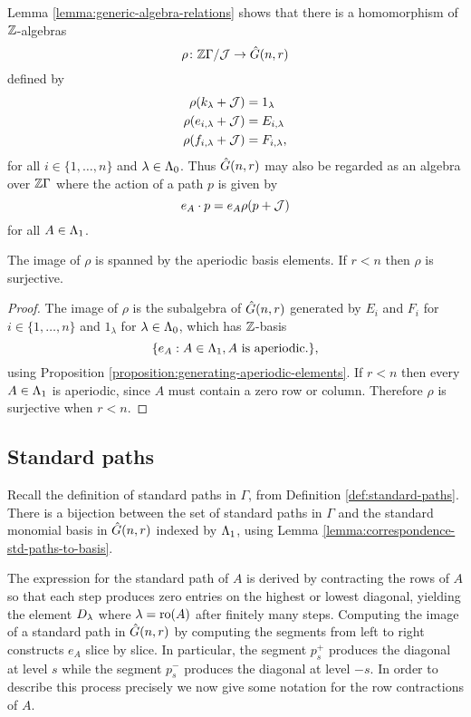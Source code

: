 \documentclass[a4paper, 11pt]{report}
\begin{document}
Lemma \ref{lemma:generic-algebra-relations} shows that there is a homomorphism of $\mathbb{Z}$-algebras
\begin{equation*}
\rho\colon\mathbb{Z}\Gamma/{\mathcal{J}}\to\hat{G}(n,r)
\end{equation*}
defined by
\begin{align*}
\rho(k_\lambda +\mathcal{J}) &= 1_\lambda\\
\rho(e_{i,\lambda} +\mathcal{J}) &= E_{i,\lambda}\\
\rho(f_{i,\lambda} +\mathcal{J}) &= F_{i,\lambda},
\end{align*}
for all $i\in\{1,\ldots,n\}$ and $\lambda\in\Lambda_0{}$. Thus $\hat{G}(n,r)$ may also be regarded as an algebra over $\mathbb{Z}\Gamma$ where the action of a path $p$ is given by
\begin{equation*}
e_A\cdot p = e_A\rho(p+\mathcal{J})
\end{equation*}
for all $A\in\Lambda_1{}$.

\begin{proposition}\label{proposition:image-of-quiver-algebra-generic}
The image of $\rho$ is spanned by the aperiodic basis elements. If $r<n$ then $\rho$ is surjective.
\end{proposition}

\begin{proof}
The image of $\rho$ is the subalgebra of $\hat{G}(n,r)$ generated by $E_i$ and $F_i$ for $i\in\{1,\ldots,n\}$ and $1_\lambda$ for $\lambda\in\Lambda_0{}$, which has $\mathbb{Z}$-basis
\begin{equation*}
\{e_A:A\in\Lambda_1{}, A\text{ is aperiodic.}\},
\end{equation*}
using Proposition \ref{proposition:generating-aperiodic-elements}. If $r<n$ then every $A\in\Lambda_1{}$ is aperiodic, since $A$ must contain a zero row or column. Therefore $\rho$ is surjective when $r<n$.
\end{proof}


\subsection{Standard paths}

Recall the definition of standard paths in $\Gamma$, from Definition \ref{def:standard-paths}. There is a bijection between the set of standard paths in $\Gamma$ and the standard monomial basis in $\hat{G}(n,r)$ indexed by $\Lambda_1{}$, using Lemma \ref{lemma:correspondence-std-paths-to-basis}.

The expression for the standard path of $A$ is derived by contracting the rows of $A$ so that each step produces zero entries on the highest or lowest diagonal, yielding the element $D_{\lambda}$ where $\lambda=\operatorname{ro}(A)$ after finitely many steps. Computing the image of a standard path in $\hat{G}(n,r)$ by computing the segments from left to right constructs $e_A$ slice by slice. In particular, the segment $p_s^+$ produces the diagonal at level $s$ while the segment $p_s^-$ produces the diagonal at level $-s$. In order to describe this process precisely we now give some notation for the row contractions of $A$.
\end{document}

